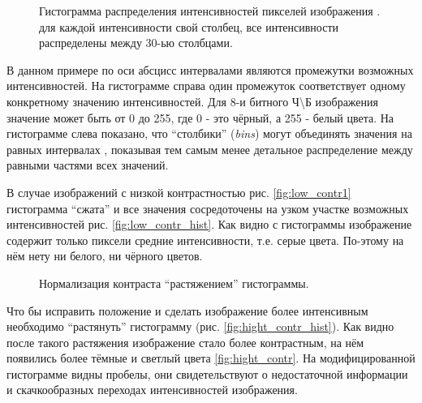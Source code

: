 \documentclass[12pt]{report}
\begin{document}
\begin{figure}[h]
	\centering
	\caption{Гистограмма распределения интенсивностей пикселей изображения .  для каждой интенсивности свой столбец,  все интенсивности распределены между 30-ью столбцами.}
	\label{fig:histo_sheldon}
\end{figure}

В данном примере по оси абсцисс интервалами являются промежутки возможных интенсивностей. На гистограмме справа 
 один промежуток соответствует одному конкретному значению интенсивностей. Для 8-и битного 
Ч\textbackslash{}Б изображения значение может быть от 0 до 255, где 0 - это чёрный, а 255 - белый цвета. На 
гистограмме слева  показано, что ``столбики'' (\textit{bins}) могут объединять значения 
на равных интервалах , показывая тем самым менее детальное распределение между равными частями всех значений.

В случае изображений с низкой контрастностью рис. \ref{fig:low_contr1} гистограмма ``сжата'' и все значения 
сосредоточены на узком участке возможных интенсивностей рис. \ref{fig:low_contr_hist}. Как видно с гистограммы 
изображение содержит только пиксели средние интенсивности, т.е. серые цвета. По-этому на нём нету ни белого, ни 
чёрного цветов.

\begin{figure}[h]
	\centering
		
	\caption{Нормализация контраста ``растяжением'' гистограммы.}
	\label{fig:contrast_norm}
\end{figure}

Что бы исправить положение и сделать изображение более интенсивным необходимо ``растянуть'' гистограмму (рис. \ref{fig:hight_contr_hist}). Как видно после такого растяжения изображение стало более контрастным, на нём появились более тёмные и светлый цвета 
\ref{fig:hight_contr}. На модифицированной гистограмме видны пробелы, они свидетельствуют о недостаточной информации и 
скачкообразных переходах интенсивностей изображения.
\end{document}
